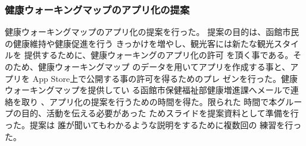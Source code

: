 ﻿\subsubsection{健康ウォーキングマップのアプリ化の提案}
健康ウォーキングマップのアプリ化の提案を行った。
提案の目的は、函館市民の健康維持や健康促進を行う
きっかけを増やし、観光客には新たな観光スタイルを
提供するために、健康ウォーキングのアプリ化の許可
を頂く事である。そのため、健康ウォーキングマップ
のデータを用いてアプリを作成する事と、アプリを
App Store上で公開する事の許可を得るためのプレ
ゼンを行った。健康ウォーキングマップを提供してい
る函館市保健福祉部健康増進課へメールで連絡を取り
、アプリ化の提案を行うための時間を得た。限られた
時間で本グループの目的、活動を伝える必要があった
ためスライドを提案資料として準備を行った。提案は
誰が聞いてもわかるような説明をするために複数回の
練習を行った。
